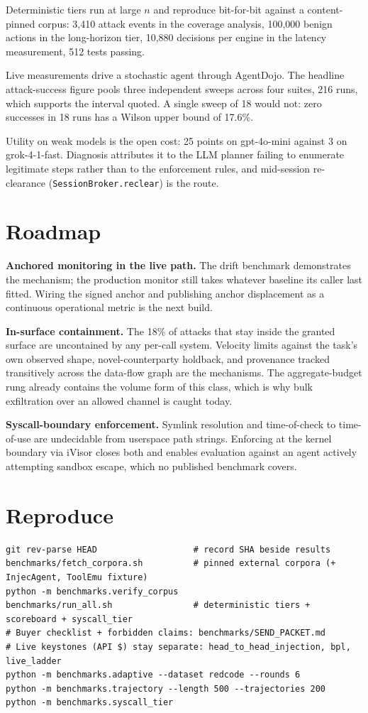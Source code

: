 \documentclass[11pt]{article}
\begin{document}
Deterministic tiers run at large $n$ and reproduce bit-for-bit against a
content-pinned corpus: 3,410 attack events in the coverage analysis, 100,000
benign actions in the long-horizon tier, 10,880 decisions per engine in the
latency measurement, 512 tests passing.

Live measurements drive a stochastic agent through AgentDojo. The headline
attack-success figure pools three independent sweeps across four suites, 216
runs, which supports the interval quoted. A single sweep of 18 would not: zero
successes in 18 runs has a Wilson upper bound of 17.6\%.

Utility on weak models is the open cost: 25 points on gpt-4o-mini against 3 on
grok-4-1-fast. Diagnosis attributes it to the LLM planner failing to enumerate
legitimate steps rather than to the enforcement rules, and mid-session
re-clearance (\texttt{SessionBroker.reclear}) is the route.

\section{Roadmap}

\textbf{Anchored monitoring in the live path.} The drift benchmark demonstrates
the mechanism; the production monitor still takes whatever baseline its caller
last fitted. Wiring the signed anchor and publishing anchor displacement as a
continuous operational metric is the next build.

\textbf{In-surface containment.} The 18\% of attacks that stay inside the
granted surface are uncontained by any per-call system. Velocity limits against
the task's own observed shape, novel-counterparty holdback, and provenance
tracked transitively across the data-flow graph are the mechanisms. The
aggregate-budget rung already contains the volume form of this class, which is
why bulk exfiltration over an allowed channel is caught today.

\textbf{Syscall-boundary enforcement.} Symlink resolution and time-of-check to
time-of-use are undecidable from userspace path strings. Enforcing at the kernel
boundary via iVisor closes both and enables evaluation against an agent actively
attempting sandbox escape, which no published benchmark covers.

\section{Reproduce}\label{sec:repro}

\begin{Verbatim}[fontsize=\small, frame=single, framesep=4pt]
git rev-parse HEAD                   # record SHA beside results
benchmarks/fetch_corpora.sh          # pinned external corpora (+ InjecAgent, ToolEmu fixture)
python -m benchmarks.verify_corpus
benchmarks/run_all.sh                # deterministic tiers + scoreboard + syscall_tier
# Buyer checklist + forbidden claims: benchmarks/SEND_PACKET.md
# Live keystones (API $) stay separate: head_to_head_injection, bpl, live_ladder
python -m benchmarks.adaptive --dataset redcode --rounds 6
python -m benchmarks.trajectory --length 500 --trajectories 200
python -m benchmarks.syscall_tier
\end{Verbatim}
\end{document}
